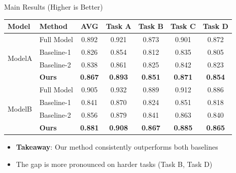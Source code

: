 \documentclass{beamer}
\begin{document}
\begin{frame}{Main Results (Higher is Better)}
    \centering
    \scriptsize
    \begin{tabular}{l|lccccc}
        \toprule
        \textbf{Model} & \textbf{Method} & \textbf{AVG} & \textbf{Task A} & \textbf{Task B} & \textbf{Task C} & \textbf{Task D} \\
        \midrule
        \multirow{4}{*}{ModelA}
        & Full Model   & 0.892 & 0.921 & 0.873 & 0.901 & 0.872 \\
        & Baseline-1   & 0.826 & 0.854 & 0.812 & 0.835 & 0.805 \\
        & Baseline-2   & 0.838 & 0.861 & 0.825 & 0.842 & 0.823 \\
        & \textbf{Ours} & \textbf{0.867} & \textbf{0.893} & \textbf{0.851} & \textbf{0.871} & \textbf{0.854} \\
        \midrule
        \multirow{4}{*}{ModelB}
        & Full Model   & 0.905 & 0.932 & 0.889 & 0.912 & 0.886 \\
        & Baseline-1   & 0.841 & 0.870 & 0.824 & 0.851 & 0.818 \\
        & Baseline-2   & 0.856 & 0.879 & 0.841 & 0.863 & 0.840 \\
        & \textbf{Ours} & \textbf{0.881} & \textbf{0.908} & \textbf{0.867} & \textbf{0.885} & \textbf{0.865} \\
        \bottomrule
    \end{tabular}

    \vspace{0.4cm}
    \normalsize
    \begin{itemize}
        \item \textcolor{AccentBlue}{\textbf{Takeaway}}: Our method consistently outperforms both baselines
        \item The gap is more pronounced on harder tasks (Task B, Task D)
    \end{itemize}
\end{frame}
\end{document}
